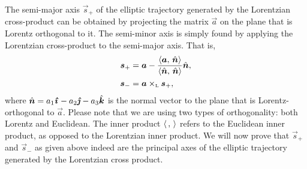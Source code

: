 The semi-major axis \(\vec{s}_+\) of the elliptic trajectory generated by the Lorentzian cross-product can be obtained by projecting the matrix \(\vec{a}\) on the plane that is Lorentz orthogonal to it. The semi-minor axis is simply found by applying the Lorentzian cross-product to the semi-major axis. That is,
\begin{equation}
    \begin{split}
        \vec{s}_+ &= \vec{a} - \frac{ \inner{\vec{a}}{\uvec{n}} }{ \inner{\uvec{n}}{\uvec{n}} } \uvec{n}, \\
        \vec{s}_- &= \lorcrossp{\vec{a}}{\vec{s}_+}, \\
    \end{split}
    \label{eq:crossp_basis_vectors}
\end{equation}
where \(\uvec{n} = a_1\quati - a_2\quatj - a_3\quatk\) is the normal vector to the plane that is Lorentz-orthogonal to \(\vec{a}\). Please note that we are using two types of orthogonality: both Lorentz and Euclidean. The inner product \(\langle \,,\, \rangle\) refers to the Euclidean inner product, as opposed to the Lorentzian inner product. We will now prove that $\vec{s}_+$ and $\vec{s}_-$ as given above indeed are the principal axes of the elliptic trajectory generated by the Lorentzian cross product.

